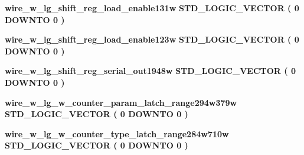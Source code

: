 \begin{DoxyCompactItemize}
\item 
{\bf wire\+\_\+w\+\_\+lg\+\_\+shift\+\_\+reg\+\_\+load\+\_\+enable131w} {\bfseries \textcolor{comment}{S\+T\+D\+\_\+\+L\+O\+G\+I\+C\+\_\+\+V\+E\+C\+T\+OR}\textcolor{vhdlchar}{ }\textcolor{vhdlchar}{(}\textcolor{vhdlchar}{ }\textcolor{vhdlchar}{ } \textcolor{vhdldigit}{0} \textcolor{vhdlchar}{ }\textcolor{keywordflow}{D\+O\+W\+N\+TO}\textcolor{vhdlchar}{ }\textcolor{vhdlchar}{ } \textcolor{vhdldigit}{0} \textcolor{vhdlchar}{ }\textcolor{vhdlchar}{)}\textcolor{vhdlchar}{ }} 
\item 
{\bf wire\+\_\+w\+\_\+lg\+\_\+shift\+\_\+reg\+\_\+load\+\_\+enable123w} {\bfseries \textcolor{comment}{S\+T\+D\+\_\+\+L\+O\+G\+I\+C\+\_\+\+V\+E\+C\+T\+OR}\textcolor{vhdlchar}{ }\textcolor{vhdlchar}{(}\textcolor{vhdlchar}{ }\textcolor{vhdlchar}{ } \textcolor{vhdldigit}{0} \textcolor{vhdlchar}{ }\textcolor{keywordflow}{D\+O\+W\+N\+TO}\textcolor{vhdlchar}{ }\textcolor{vhdlchar}{ } \textcolor{vhdldigit}{0} \textcolor{vhdlchar}{ }\textcolor{vhdlchar}{)}\textcolor{vhdlchar}{ }} 
\item 
{\bf wire\+\_\+w\+\_\+lg\+\_\+shift\+\_\+reg\+\_\+serial\+\_\+out1948w} {\bfseries \textcolor{comment}{S\+T\+D\+\_\+\+L\+O\+G\+I\+C\+\_\+\+V\+E\+C\+T\+OR}\textcolor{vhdlchar}{ }\textcolor{vhdlchar}{(}\textcolor{vhdlchar}{ }\textcolor{vhdlchar}{ } \textcolor{vhdldigit}{0} \textcolor{vhdlchar}{ }\textcolor{keywordflow}{D\+O\+W\+N\+TO}\textcolor{vhdlchar}{ }\textcolor{vhdlchar}{ } \textcolor{vhdldigit}{0} \textcolor{vhdlchar}{ }\textcolor{vhdlchar}{)}\textcolor{vhdlchar}{ }} 
\item 
{\bf wire\+\_\+w\+\_\+lg\+\_\+w\+\_\+counter\+\_\+param\+\_\+latch\+\_\+range294w379w} {\bfseries \textcolor{comment}{S\+T\+D\+\_\+\+L\+O\+G\+I\+C\+\_\+\+V\+E\+C\+T\+OR}\textcolor{vhdlchar}{ }\textcolor{vhdlchar}{(}\textcolor{vhdlchar}{ }\textcolor{vhdlchar}{ } \textcolor{vhdldigit}{0} \textcolor{vhdlchar}{ }\textcolor{keywordflow}{D\+O\+W\+N\+TO}\textcolor{vhdlchar}{ }\textcolor{vhdlchar}{ } \textcolor{vhdldigit}{0} \textcolor{vhdlchar}{ }\textcolor{vhdlchar}{)}\textcolor{vhdlchar}{ }} 
\item 
{\bf wire\+\_\+w\+\_\+lg\+\_\+w\+\_\+counter\+\_\+type\+\_\+latch\+\_\+range284w710w} {\bfseries \textcolor{comment}{S\+T\+D\+\_\+\+L\+O\+G\+I\+C\+\_\+\+V\+E\+C\+T\+OR}\textcolor{vhdlchar}{ }\textcolor{vhdlchar}{(}\textcolor{vhdlchar}{ }\textcolor{vhdlchar}{ } \textcolor{vhdldigit}{0} \textcolor{vhdlchar}{ }\textcolor{keywordflow}{D\+O\+W\+N\+TO}\textcolor{vhdlchar}{ }\textcolor{vhdlchar}{ } \textcolor{vhdldigit}{0} \textcolor{vhdlchar}{ }\textcolor{vhdlchar}{)}\textcolor{vhdlchar}{ }} 

\end{DoxyCompactItemize}
